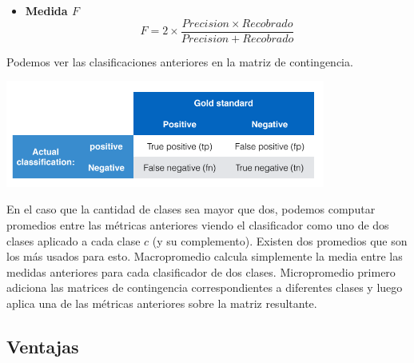 \documentclass[t,compress,10pt,xcolor=dvipsnames]{beamer}
\begin{document}
{\begin{itemize}
				
		\framebreak	
				\item\textbf{Medida $F$} 
				$$
				F = 2 \times  \frac{Precision \times Recobrado}{Precision + Recobrado}
				$$
			\end{itemize}
			
			
			
		\framebreak	
			
			Podemos ver las clasificaciones anteriores en la matriz de contingencia. 
			
			\includegraphics[width=10.5cm]{Tabla.png}
			
		\framebreak	
					
			En el caso que la cantidad de clases sea mayor que dos, podemos computar promedios entre las m\'etricas anteriores viendo el clasificador como uno de dos clases aplicado a cada clase $c$ (y su complemento). Existen dos promedios que son los m\'as usados para esto. Macropromedio calcula simplemente la media entre las medidas anteriores para cada clasificador de dos clases. Micropromedio primero adiciona las matrices de contingencia correspondientes a diferentes clases y luego aplica una de las m\'etricas anteriores sobre la matriz resultante. 
			
				
	}
	
	\subsection{Ventajas}
	
\end{document}
